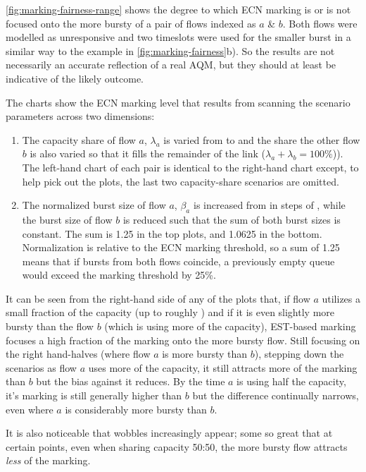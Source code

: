 \autoref{fig:marking-fairness-range} shows the degree to which ECN marking is or is not focused onto the more bursty of a pair of flows indexed as \(a\) \& \(b\). Both flows were modelled as unresponsive and two timeslots were used for the smaller burst in a similar way to the example in \autoref{fig:marking-fairness}b). So the results are not necessarily an accurate reflection of a real AQM, but they should at least be indicative of the likely outcome.

The charts show the ECN marking level that results from scanning the scenario parameters across two dimensions:
\begin{enumerate}
	\item The capacity share of flow \(a\), \(\lambda_a\) is varied from  to  and the share the other flow \(b\) is also varied so that it fills the remainder of the link (\(\lambda_a+\lambda_b=100\%\))). The left-hand chart of each pair is identical to the right-hand chart except, to help pick out the plots, the last two capacity-share scenarios are omitted.
	\item The normalized burst size of flow \(a\), \(\beta_a\) is increased from  in steps of , while the burst size of flow \(b\) is reduced such that the sum of both burst sizes is constant. The sum is 1.25 in the top plots, and 1.0625 in the bottom. 	Normalization is relative to the ECN marking threshold, so a sum of 1.25 means that if bursts from both flows coincide, a previously empty queue would exceed the marking threshold by 25\%.
\end{enumerate}

It can be seen from the right-hand side of any of the plots that, if flow \(a\) utilizes a small fraction of the capacity (up to roughly ) and if it is even slightly more bursty than the flow \(b\) (which is using more of the capacity), EST-based marking focuses a high fraction of the marking onto the more bursty flow. Still focusing on the right hand-halves (where flow \(a\) is more bursty than \(b\)), stepping down the scenarios as flow \(a\) uses more of the capacity, it still attracts more of the marking than \(b\) but the bias against it reduces. By the time \(a\) is using half the capacity, it's marking is still generally higher than \(b\) but the difference continually narrows, even where \(a\) is considerably more bursty than \(b\).

It is also noticeable that wobbles increasingly appear; some so great that at certain points, even when sharing capacity 50:50, the more bursty flow attracts \emph{less} of the marking. 

